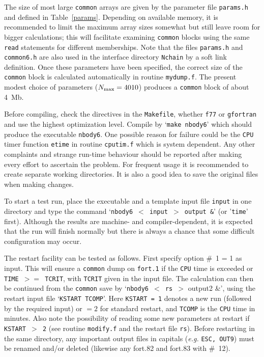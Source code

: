 \documentclass[12pt]{article}
\begin{document}
The size of most large {\tt common} arrays are given by the parameter file
{\tt params.h} and defined in Table~\ref{params}.
Depending on available memory, it is recommended to limit the maximum array
sizes somewhat but still leave room for bigger calculations; this will
facilitate examining {\tt common} blocks using the same {\tt read}
statements for different memberships.
Note that the files {\tt params.h} and {\tt common6.h} are also used in the
interface directory {\tt Nchain} by a soft link definition.
Once these parameters have been specified, the correct size of the
{\tt common} block is calculated automatically in routine {\tt mydump.f}.
The present modest choice of parameters ($N_{\rm max} = 4010$) produces a
{\tt common} block of about 4~Mb.

Before compiling, check the {} directives in the {\tt Makefile},
\ie whether {\tt f77} or {\tt gfortran} and use the highest optimization level.
Compile by `{\tt make nbody6}' which should produce the executable {\tt nbody6}.
One possible reason for failure could be the {\tt CPU} timer function
{\tt etime} in routine {\tt cputim.f} which is system dependent.
Any other complaints and strange run-time behaviour should be reported after
making every effort to ascertain the problem.
For frequent usage it is recommended to create separate working directories.
It is also a good idea to save the original files when making changes.

To start a test run, place the executable and a template input file
{\tt input} in one directory and type the command
`{\tt nbody6 $<$ input $>$ output \&}' (or '{\tt time}' first).
Although the results are machine- and compiler-dependent, it is expected that
the run will finish normally but there is always a chance that some difficult
configuration may occur.

The restart facility can be tested as follows.
First specify option \#~1 = 1 as input.
This will ensure a {\tt common} dump on {\tt fort.1} if the {\tt CPU} time is
exceeded or {\tt TIME $>=$ TCRIT}, with {\tt TCRIT} given in the input file.
The calculation can then be continued from the {\tt common} save by
`{\tt nbody6 $<$ rs $>$} output2 \&',
using the restart input file `{\tt KSTART TCOMP}'.
Here {\tt KSTART = 1} denotes a new run (followed by the required input)
or $= 2$ for standard restart, and {\tt TCOMP} is the {\tt CPU} time in
minutes.
Also note the possibility of reading some new parameters at restart if
{\tt KSTART $>$ 2} (see routine {\tt modify.f} and the restart
file {\tt rs}).
Before restarting in the same directory, any important output files in
capitals ({\it e.g.} {\tt ESC, OUT9}) must be renamed and/or deleted
(likewise any fort.82 and fort.83 with \#~12).
\end{document}
